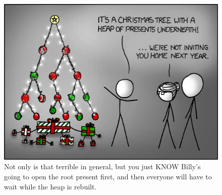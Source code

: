 \documentclass[letterpaper,12pt]{article}
\begin{document}
\begin{figure}[ht!]
	\centering
	\includegraphics[width=5in]{tree.png}
    \caption*{Not only is that terrible in general, but you just KNOW Billy's going to open the root present first, and then everyone will have to wait while the heap is rebuilt.}
\end{figure}
\end{document}
